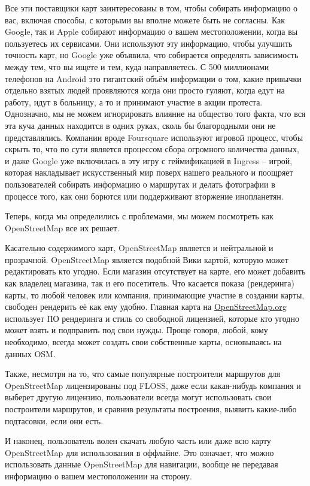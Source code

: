 Все эти поставщики карт заинтересованы в том, чтобы собирать информацию о вас, 
включая способы, с которыми вы вполне можете быть не согласны. Как Google, так 
и Apple собирают информацию о вашем местоположении, когда вы пользуетесь их 
сервисами. Они используют эту информацию, чтобы улучшить точность карт, но 
Google уже объявила, что собирается определять зависимость между тем, что вы 
ищете и тем, куда направляетесь. С 500 миллионами телефонов на Android это 
гигантский объём информации о том, какие привычки отдельно взятых людей 
проявляются когда они просто гуляют, когда едут на работу, идут в больницу, а 
то и принимают участие в акции протеста. Однозначно, мы не можем игнорировать 
влияние на общество того факта, что вся эта куча данных находится в одних 
руках, сколь бы благородными они не представлялись. Компании вроде 
Foursquare\cite{four4} используют игровой процесс, чтобы скрыть то, что по 
сути является процессом сбора огромного количества данных, и даже Google уже 
включилась в эту игру с геймификацией в Ingress\cite{ingress} -- игрой, 
которая накладывает искусственный мир поверх нашего реального и поощряет 
пользователей собирать информацию о маршрутах и делать фотографии в процессе 
того, как они борются или поддерживают вторжение инопланетян.

Теперь, когда мы определились с проблемами, мы можем посмотреть как 
OpenStreetMap все их решает.

Касательно содержимого карт, OpenStreetMap является и нейтральной и 
прозрачной. OpenStreetMap является подобной Вики картой, которую может 
редактировать кто угодно. Если магазин отсутствует на карте, его может 
добавить как владелец магазина, так и его посетитель. Что касается показа 
(рендеринга) карты, то любой человек или компания, принимающие участие в 
создании карты, свободен рендерить её как ему удобно. Главная карта на 
\url{OpenStreetMap.org} использует ПО рендеринга и стиль со свободной 
лицензией, которые кто угодно может взять и подправить под свои нужды. 
Проще говоря, любой, кому необходимо, всегда может создать свои собственные 
карты, основываясь на данных OSM.

Также, несмотря на то, что самые популярные построители маршрутов для 
OpenStreetMap лицензированы под FLOSS\cite{floss}, даже если какая-нибудь 
компания и выберет другую лицензию, пользователи всегда могут использовать 
свои построители маршрутов, и сравнив результаты построения, выявить 
какие-либо подтасовки, если они есть.

И наконец, пользователь волен скачать любую часть или даже всю карту 
OpenStreetMap для использования в оффлайне. Это означает, что можно 
использовать данные OpenStreetMap для навигации, вообще не передавая 
информацию о вашем местоположении на сторону.
\cite{habrahabr01}

